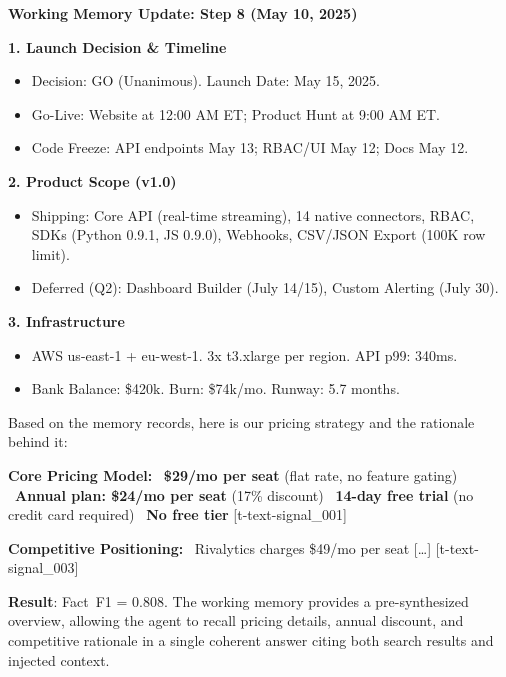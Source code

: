 \documentclass[11pt,a4paper]{article}
\begin{document}
\begin{artifactbox}[title=core-memory artifact (3{,}104 chars --- excerpt)]
\small
\textbf{Working Memory Update: Step 8 (May 10, 2025)}

\textbf{1. Launch Decision \& Timeline}
\begin{itemize}[nosep,leftmargin=1em]
\item Decision: GO (Unanimous). Launch Date: May 15, 2025.
\item Go-Live: Website at 12:00 AM ET; Product Hunt at 9:00 AM ET.
\item Code Freeze: API endpoints May 13; RBAC/UI May 12; Docs May 12.
\end{itemize}

\textbf{2. Product Scope (v1.0)}
\begin{itemize}[nosep,leftmargin=1em]
\item Shipping: Core API (real-time streaming), 14 native connectors, RBAC, SDKs (Python 0.9.1, JS 0.9.0), Webhooks, CSV/JSON Export (100K row limit).
\item Deferred (Q2): Dashboard Builder (July 14/15), Custom Alerting (July 30).
\end{itemize}

\textbf{3. Infrastructure}
\begin{itemize}[nosep,leftmargin=1em]
\item AWS us-east-1 + eu-west-1. 3x t3.xlarge per region. API p99: 340ms.
\item Bank Balance: \$420k. Burn: \$74k/mo. Runway: 5.7 months.
\end{itemize}
\end{artifactbox}

\begin{tracebox}[title=core --- Agent Answer (1 tool call)]
\small
Based on the memory records, here is our pricing strategy and the rationale behind it:

\textbf{Core Pricing Model:}
\textbullet\ \textbf{\$29/mo per seat} (flat rate, no feature gating)
\textbullet\ \textbf{Annual plan: \$24/mo per seat} (17\% discount)
\textbullet\ \textbf{14-day free trial} (no credit card required)
\textbullet\ \textbf{No free tier} [t-text-signal\_001]

\textbf{Competitive Positioning:}
\textbullet\ Rivalytics charges \$49/mo per seat [\ldots] [t-text-signal\_003]
\end{tracebox}

\textbf{Result}: Fact~F1 = 0.808. The working memory provides a pre-synthesized overview, allowing the agent to recall pricing details, annual discount, and competitive rationale in a single coherent answer citing both search results and injected context.
\end{document}

